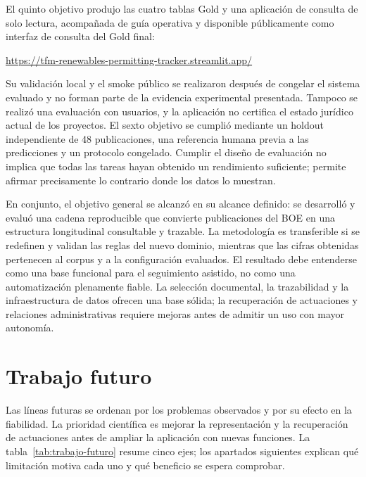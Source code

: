 El quinto objetivo produjo las cuatro tablas Gold y una aplicación de consulta
de solo lectura, acompañada de guía operativa y disponible públicamente como
interfaz de consulta del Gold final:
\begin{center}
\url{https://tfm-renewables-permitting-tracker.streamlit.app/}
\end{center}
Su validación local y el smoke público se realizaron
después de congelar el sistema evaluado y no forman parte de la evidencia
experimental presentada. Tampoco se realizó una evaluación con usuarios, y la
aplicación no certifica el estado jurídico actual de los proyectos. El sexto
objetivo se cumplió mediante un
holdout independiente de 48 publicaciones, una referencia humana previa a las
predicciones y un protocolo congelado. Cumplir el diseño de evaluación no
implica que todas las tareas hayan obtenido un rendimiento suficiente; permite
afirmar precisamente lo contrario donde los datos lo muestran.

En conjunto, el objetivo general se alcanzó en su alcance definido: se
desarrolló y evaluó una cadena reproducible que convierte publicaciones del
BOE en una estructura longitudinal consultable y trazable. La metodología es
transferible si se redefinen y validan las reglas del nuevo dominio, mientras
que las cifras obtenidas pertenecen al corpus y a la configuración evaluados.
El resultado debe entenderse como una base funcional para el seguimiento
asistido, no como una automatización plenamente fiable. La selección
documental, la trazabilidad y la infraestructura de datos ofrecen una base
sólida; la recuperación de actuaciones y relaciones administrativas requiere
mejoras antes de admitir un uso con mayor autonomía.

\section{Trabajo futuro}

Las líneas futuras se ordenan por los problemas observados y por su efecto en
la fiabilidad. La prioridad científica es mejorar la representación y la
recuperación de actuaciones antes de ampliar la aplicación con nuevas
funciones. La tabla~\ref{tab:trabajo-futuro} resume cinco ejes; los apartados
siguientes explican qué limitación motiva cada uno y qué beneficio se espera
comprobar.


